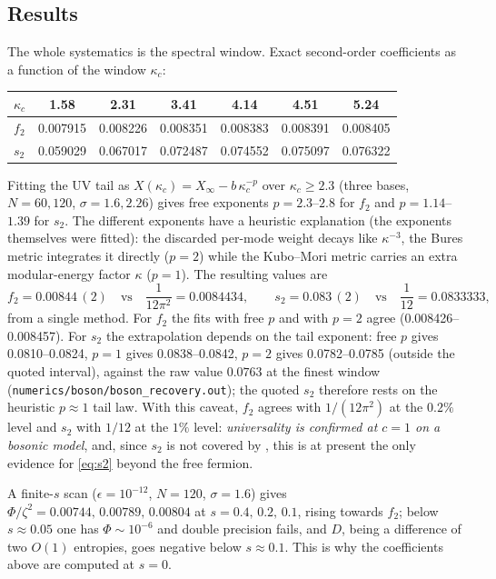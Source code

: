 \subsection{Results}

The whole systematics is the spectral window.  Exact second-order coefficients as a function of the window
$\kappa_{c}$:
\begin{center}
\begin{tabular}{@{}lcccccc@{}}\toprule
$\kappa_{c}$ & 1.58 & 2.31 & 3.41 & 4.14 & 4.51 & 5.24\\\midrule
$f_{2}$ & 0.007915 & 0.008226 & 0.008351 & 0.008383 & 0.008391 & 0.008405\\
$s_{2}$ & 0.059029 & 0.067017 & 0.072487 & 0.074552 & 0.075097 & 0.076322\\\bottomrule
\end{tabular}
\end{center}
Fitting the UV tail as $X(\kappa_{c})=X_{\infty}-b\,\kappa_{c}^{-p}$ over $\kappa_{c}\ge2.3$ (three bases,
$N=60,120$, $\sigma=1.6,2.26$) gives free exponents $p=2.3$--$2.8$ for $f_{2}$ and $p=1.14$--$1.39$ for
$s_{2}$.  The different exponents have a heuristic explanation (the exponents themselves were fitted): the discarded per-mode weight decays like
$\kappa^{-3}$, the Bures metric integrates it directly ($p=2$) while the Kubo--Mori metric carries an extra
modular-energy factor $\kappa$ ($p=1$).  The resulting values are
\begin{equation}\label{eq:bosonvals}
 f_{2}=0.00844\,(2)\quad\text{vs}\quad \frac{1}{12\pi^{2}}=0.0084434,
 \qquad
 s_{2}=0.083\,(2)\quad\text{vs}\quad \frac{1}{12}=0.0833333,
\end{equation}
from a single method.  For $f_{2}$ the fits with free $p$ and with $p=2$ agree (0.008426--0.008457).  For $s_{2}$
the extrapolation depends on the tail exponent: free $p$ gives 0.0810--0.0824, $p=1$ gives 0.0838--0.0842,
$p=2$ gives 0.0782--0.0785 (outside the quoted interval), against the raw value $0.0763$ at the finest window
(\texttt{numerics/boson/boson\_recovery.out}); the quoted $s_{2}$ therefore rests on the heuristic $p\approx1$
tail law.  With this caveat, $f_{2}$ agrees with $1/(12\pi^{2})$ at the $0.2\%$ level and $s_{2}$ with $1/12$
at the $1\%$ level: \emph{universality is
confirmed at $c=1$ on a bosonic model}, and, since $s_{2}$ is not covered by , this is at
present the only evidence for \eqref{eq:s2} beyond the free fermion.

A finite-$s$ scan ($\epsilon=10^{-12}$, $N=120$, $\sigma=1.6$) gives $\Phi/\zeta^{2}=0.00744,\,0.00789,\,
0.00804$ at $s=0.4,\,0.2,\,0.1$, rising towards $f_{2}$; below $s\approx0.05$ one has $\Phi\sim10^{-6}$ and
double precision fails, and $D$, being a difference of two $O(1)$ entropies, goes negative below
$s\approx0.1$.  This is why the coefficients above are computed at $s=0$.

